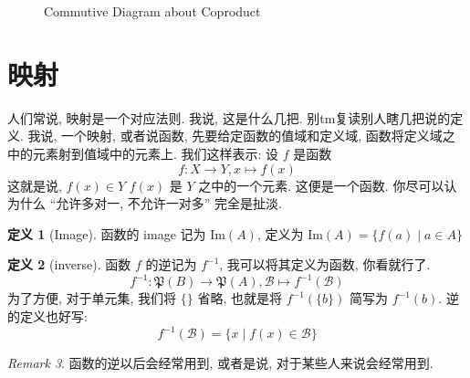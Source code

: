 \documentclass[10pt]{ctexart}
\theoremstyle{definition}
\theoremstyle{definition}
\newtheorem{definition}{定义}[section]
\theoremstyle{plain}
\theoremstyle{remark}
\newtheorem{remark}[definition]{Remark}
\begin{document}
\begin{figure}
\centering
{}
\caption{Commutive Diagram about Coproduct}\label{fig:coprod}
\end{figure}

\section{映射}
人们常说, 映射是一个对应法则. 我说, 这是什么几把. 别tm复读别人瞎几把说的定义. 我说, 一个映射, 或者说函数, 先要给定函数的值域和定义域, 函数将定义域之中的元素射到值域中的元素上. 我们这样表示: 设 \(f\) 是函数
\begin{equation}
f \colon X \to Y , x \mapsto f (x) 
\end{equation}
这就是说, \(f (x) \in Y\) \(f (x) \) 是 \(Y\) 之中的一个元素. 这便是一个函数. 你尽可以认为什么 ``允许多对一, 不允许一对多'' 完全是扯淡. 
\begin{definition}[Image]\label{def:image}
	函数的 image 记为 \(\mathrm{Im} (A)\), 定义为 \(\mathrm {Im} (A) = \{ f (a) \mid a \in A \} \)
\end{definition}
\begin{definition}[inverse]
函数 \(f\) 的逆记为 \(f ^{-1}\), 我可以将其定义为函数, 你看就行了. 
\begin{equation}
f^{-1} \colon \mathfrak P (B) \to \mathfrak P(A) , \mathcal B \mapsto f ^{-1} (\mathcal B) 
\end{equation}
为了方便, 对于单元集, 我们将 \(\{ \}\) 省略, 也就是将 \(f ^{-1} (\{b \} ) \) 简写为 \(f ^{-1} (b)\). 逆的定义也好写:
\begin{equation}
f ^{-1} (\mathcal B ) = \{ x \mid f(x) \in \mathcal B \} 
\end{equation}
\end{definition}
\begin{remark}
函数的逆以后会经常用到, 或者是说, 对于某些人来说会经常用到. 
\end{remark}
\end{document}
